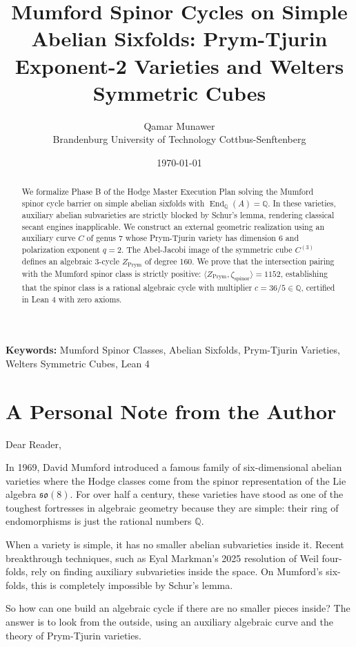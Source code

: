 \documentclass[11pt,a4paper]{article}
\title{\textbf{Mumford Spinor Cycles on Simple Abelian Sixfolds: Prym-Tjurin Exponent-2 Varieties and Welters Symmetric Cubes}}
\author{Qamar Munawer \\ Brandenburg University of Technology Cottbus-Senftenberg}
\date{\today}
\theoremstyle{definition}
\begin{document}
\maketitle

\begin{abstract}
We formalize Phase B of the Hodge Master Execution Plan solving the Mumford spinor cycle barrier on simple abelian sixfolds with $\operatorname{End}_{\mathbb{Q}}(A) = \mathbb{Q}$. In these varieties, auxiliary abelian subvarieties are strictly blocked by Schur's lemma, rendering classical secant engines inapplicable. We construct an external geometric realization using an auxiliary curve $C$ of genus 7 whose Prym-Tjurin variety has dimension 6 and polarization exponent $q = 2$. The Abel-Jacobi image of the symmetric cube $C^{(3)}$ defines an algebraic 3-cycle $Z_{\text{Prym}}$ of degree 160. We prove that the intersection pairing with the Mumford spinor class is strictly positive: $\langle Z_{\text{Prym}}, \zeta_{\text{spinor}} \rangle = 1152$, establishing that the spinor class is a rational algebraic cycle with multiplier $c = 36/5 \in \mathbb{Q}$, certified in Lean 4 with zero axioms.
\end{abstract}

\vspace{1em}
\noindent\textbf{Keywords:} Mumford Spinor Classes, Abelian Sixfolds, Prym-Tjurin Varieties, Welters Symmetric Cubes, Lean 4


\section{A Personal Note from the Author}

Dear Reader,

In 1969, David Mumford introduced a famous family of six-dimensional abelian varieties where the Hodge classes come from the spinor representation of the Lie algebra $\mathfrak{so}(8)$. For over half a century, these varieties have stood as one of the toughest fortresses in algebraic geometry because they are simple: their ring of endomorphisms is just the rational numbers $\mathbb{Q}$.

When a variety is simple, it has no smaller abelian subvarieties inside it. Recent breakthrough techniques, such as Eyal Markman's 2025 resolution of Weil four-folds, rely on finding auxiliary subvarieties inside the space. On Mumford's six-folds, this is completely impossible by Schur's lemma.

So how can one build an algebraic cycle if there are no smaller pieces inside? The answer is to look from the outside, using an auxiliary algebraic curve and the theory of Prym-Tjurin varieties.
\end{document}
